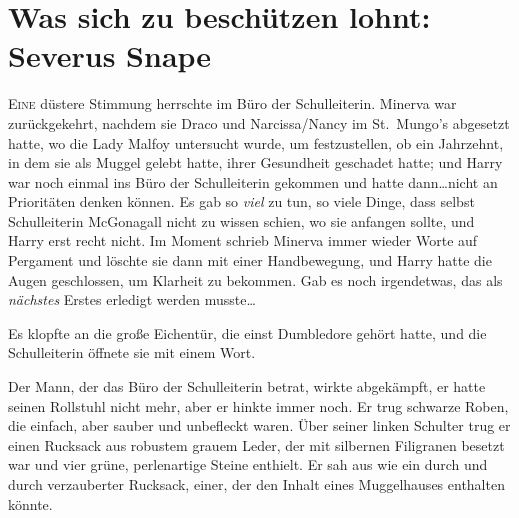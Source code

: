 \chapter{Was sich zu beschützen lohnt: Severus Snape}

\lettrine{E}{ine} düstere Stimmung herrschte im Büro der Schulleiterin. Minerva war zurückgekehrt, nachdem sie Draco und Narcissa/Nancy im St.~Mungo’s abgesetzt hatte, wo die Lady Malfoy untersucht wurde, um festzustellen, ob ein Jahrzehnt, in dem sie als Muggel gelebt hatte, ihrer Gesundheit geschadet hatte; und Harry war noch einmal ins Büro der Schulleiterin gekommen und hatte dann…nicht an Prioritäten denken können. Es gab so \emph{viel} zu tun, so viele Dinge, dass selbst Schulleiterin McGonagall nicht zu wissen schien, wo sie anfangen sollte, und Harry erst recht nicht. Im Moment schrieb Minerva immer wieder Worte auf Pergament und löschte sie dann mit einer Handbewegung, und Harry hatte die Augen geschlossen, um Klarheit zu bekommen.
Gab es noch irgendetwas, das als \emph{nächstes} Erstes erledigt werden musste…

Es klopfte an die große Eichentür, die einst Dumbledore gehört hatte, und die Schulleiterin öffnete sie mit einem Wort.

Der Mann, der das Büro der Schulleiterin betrat, wirkte abgekämpft, er hatte seinen Rollstuhl nicht mehr, aber er hinkte immer noch. Er trug schwarze Roben, die einfach, aber sauber und unbefleckt waren. Über seiner linken Schulter trug er einen Rucksack aus robustem grauem Leder, der mit silbernen Filigranen besetzt war und vier grüne, perlenartige Steine enthielt. Er sah aus wie ein durch und durch verzauberter Rucksack, einer, der den Inhalt eines Muggelhauses enthalten könnte.

